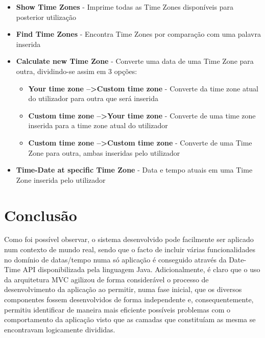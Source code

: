 \documentclass{article}
\begin{document}
\begin{itemize}
    \item \textbf{Show Time Zones} - Imprime todas as Time Zones disponíveis para posterior utilização
    \item \textbf{Find Time Zones} - Encontra Time Zones por comparação com uma palavra inserida
    \item \textbf{Calculate new Time Zone} - Converte uma data de uma Time Zone para outra, dividindo-se assim em 3 opções:
        \begin{itemize}
        \item \textbf{Your time zone    --\textgreater  Custom time zone} - Converte da time zone atual do utilizador para outra que será inserida
        \item \textbf{Custom time zone  --\textgreater   Your time zone} - Converte de uma time zone inserida para a time zone atual do utilizador
        \item \textbf{Custom time zone  --\textgreater   Custom time zone} - Converte de uma Time Zone para outra, ambas inseridas pelo utilizador
        \end{itemize}
    \item \textbf{Time-Date at specific Time Zone} - Data e tempo atuais em uma Time Zone inserida pelo utilizador
\end{itemize}

\newpage

\section{Conclusão}
Como foi possível observar, o sistema desenvolvido pode facilmente ser aplicado num contexto de mundo real, sendo que o facto de incluir várias 
funcionalidades no domínio de datas/tempo numa só aplicação é conseguido através da Date-Time API disponibilizada pela linguagem Java.
Adicionalmente, é claro que o uso da arquitetura MVC agilizou de forma considerável o processo de desenvolvimento da aplicação ao permitir, numa
fase inicial, que os diversos componentes fossem desenvolvidos de forma independente e, consequentemente, permitiu identificar de maneira mais 
eficiente possíveis problemas com o comportamento da aplicação visto que as camadas que constituíam as mesma se encontravam logicamente divididas.
\end{document}
